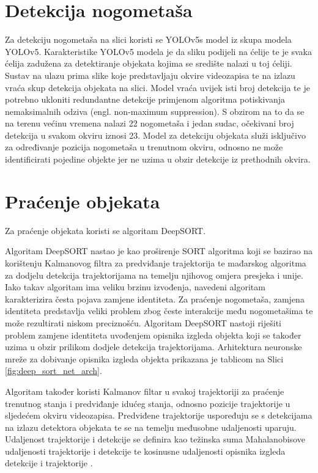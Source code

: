 \documentclass[times, utf8, seminar, numeric]{fer}
\begin{document}
\section{Detekcija nogometaša}
Za detekciju nogometaša na slici koristi se YOLOv5s model iz skupa modela YOLOv5. Karakteristike YOLOv5 modela je da sliku podijeli na ćelije te je svaka ćelija zadužena za detektiranje objekata kojima se središte nalazi u toj ćeliji. Sustav na ulazu prima slike koje predstavljaju okvire videozapisa te na izlazu vraća skup detekcija objekata na slici. Model vraća uvijek isti broj detekcija te je potrebno ukloniti redundantne detekcije primjenom algoritma potiskivanja nemaksimalnih odziva (engl. non-maximum suppression). S obzirom na to da se na terenu većinu vremena nalazi 22 nogometaša i jedan sudac, očekivani broj detekcija u svakom okviru iznosi 23. Model za detekciju objekata služi isključivo za određivanje pozicija nogometaša u trenutnom okviru, odnosno ne može identificirati pojedine objekte jer ne uzima u obzir detekcije iz prethodnih okvira. 	



\section{Praćenje objekata}
Za praćenje objekata koristi se algoritam DeepSORT.

Algoritam DeepSORT \cite{deepsort} nastao je kao proširenje SORT \cite{sort} algoritma koji se bazirao na korištenju Kalmanovog filtra za predviđanje trajektorija te mađarskog algoritma za dodjelu detekcija trajektorijama na temelju njihovog omjera presjeka i unije. Iako takav algoritam ima veliku brzinu izvođenja, navedeni algoritam karakterizira česta pojava zamjene identiteta. Za praćenje nogometaša, zamjena identiteta predstavlja veliki problem zbog česte interakcije među nogometašima te može rezultirati niskom preciznošću. Algoritam DeepSORT nastoji riješiti problem zamjene identiteta uvođenjem opisnika izgleda objekta koji se također uzima u obzir prilikom dodjele detekcija trajektorijama. Arhitektura neuronske mreže za dobivanje opisnika izgleda objekta prikazana je tablicom na Slici \ref{fig:deep_sort_net_arch}.
  
Algoritam također koristi Kalmanov filtar u svakoj trajektoriji za praćenje trenutnog stanja i predviđanje idućeg stanja, odnosno pozicije trajektorije u sljedećem okviru videozapisa. 
Predviđene trajektorije uspoređuju se s detekcijama na izlazu detektora objekata te se na temelju međusobne udaljenosti uparuju.
Udaljenost trajektorije i detekcije se definira kao težinska suma Mahalanobisove udaljenosti trajektorije i detekcije te kosinusne udaljenosti opisnika izgleda detekcije i trajektorije \cite{deepsort}. 
\end{document}
